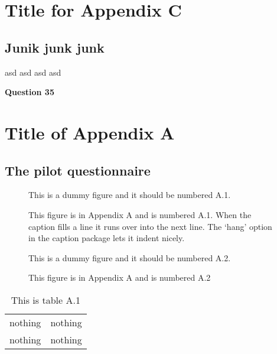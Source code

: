 \appendix
\setcounter{chapter}{2}
\renewcommand{\chaptermark}[1]%
	{\markboth{Appendix \thechapter. #1}{}}
\chapter{Title for Appendix C}
\label{appendixC}

\section{Junik junk junk} %
\begin{singlespace}
asd
asd
asd
asd
\end{singlespace}
\small
\noindent\textbf{Question 35}\\


\appendix
\renewcommand{\chaptermark}[1]%
	{\markboth{Appendix \thechapter. #1}{}}
\setcounter{chapter}{0}

\chapter{Title of Appendix A}
\label{appendixA}

\section{The pilot questionnaire}


\begin{figure}
This is a dummy figure and it should be numbered A.1.
\caption{This figure is in Appendix A and is numbered A.1. When the caption
fills a line it runs over into the next line.  The `hang' option in the caption
package lets it indent nicely.}
\end{figure}

\begin{figure}
This is a dummy figure and it should be numbered A.2.
\caption{This figure is in Appendix A and is numbered A.2}
\end{figure}

\begin{table}
\caption{This is table A.1}
\begin{tabular}{ll}
nothing& nothing\\
nothing& nothing\\
\end{tabular}

\end{table}



